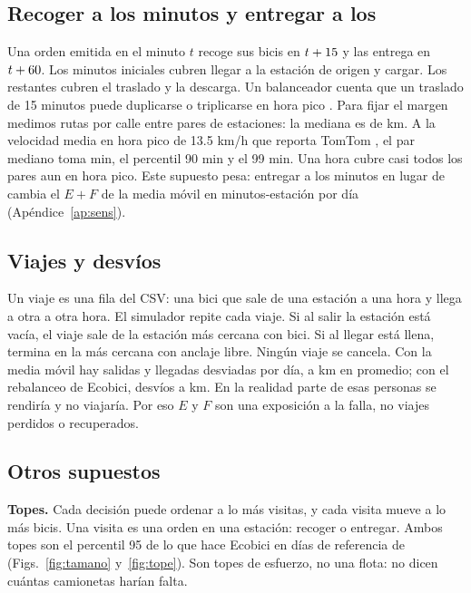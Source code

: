 \documentclass[conference,letterpaper,10pt]{IEEEtran}
\newcommand{\EF}{E+F}
\begin{document}
\subsection{Recoger a los \rpickMin{} minutos y entregar a los \rdelMin}
Una orden emitida en el minuto $t$ recoge sus bicis en $t+15$ y las entrega en $t+60$. Los \rpickMin{} minutos iniciales cubren llegar a la estación de origen y cargar. Los \rtransMin{} restantes cubren el traslado y la descarga. Un balanceador cuenta que un traslado de 15 minutos puede duplicarse o triplicarse en hora pico \cite{expansion2026}. Para fijar el margen medimos rutas por calle entre pares de estaciones: la mediana es de \rcalleMed{} km. A la velocidad media en hora pico de 13.5 km/h que reporta TomTom \cite{tomtom2025}, el par mediano toma \rpicoMed{} min, el percentil 90 \rpicoNoventa{} min y el 99 \rpicoNN{} min. Una hora cubre casi todos los pares aun en hora pico. Este supuesto pesa: entregar a los \rentregaLarga{} minutos en lugar de \rdelMin{} cambia el $\EF$ de la media móvil en \rsSetenta{} minutos-estación por día (Apéndice~\ref{ap:sens}).

\subsection{Viajes y desvíos}
Un viaje es una fila del CSV: una bici que sale de una estación a una hora y llega a otra a otra hora. El simulador repite cada viaje. Si al salir la estación está vacía, el viaje sale de la estación más cercana con bici. Si al llegar está llena, termina en la más cercana con anclaje libre. Ningún viaje se cancela. Con la media móvil hay \rmaDesvSal{} salidas y \rmaDesvLleg{} llegadas desviadas por día, a \rmaKm{} km en promedio; con el rebalanceo de Ecobici, \recoDesv{} desvíos a \recoKm{} km. En la realidad parte de esas personas se rendiría y no viajaría. Por eso $E$ y $F$ son una exposición a la falla, no viajes perdidos o recuperados.

\subsection{Otros supuestos}
\textbf{Topes.} Cada decisión puede ordenar a lo más \rtopeVis{} visitas, y cada visita mueve a lo más \rtopeBicis{} bicis. Una visita es una orden en una estación: recoger o entregar. Ambos topes son el percentil 95 de lo que hace Ecobici en \rrefDias{} días de referencia de \rrefPeriodo{} (Figs.~\ref{fig:tamano} y~\ref{fig:tope}). Son topes de esfuerzo, no una flota: no dicen cuántas camionetas harían falta.
\end{document}
